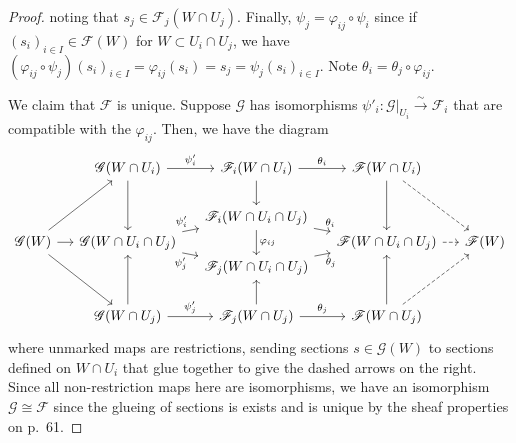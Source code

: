 \documentclass[12pt,letterpaper]{article}
\theoremstyle{definition}
\theoremstyle{remark}
\numberwithin{equation}{section}
\numberwithin{figure}{problem}
\newcommand{\isoto}{\overset{\sim}{\to}}%
\begin{document}
\begin{proof}
  noting that $s_j \in \mathscr{F}_j(W \cap U_j)$. Finally, $\psi_j = \varphi_{ij} \circ \psi_i$ since if $(s_i)_{i \in I} \in \mathscr{F}(W)$ for $W \subset U_i \cap U_j$, we have $(\varphi_{ij} \circ \psi_j)(s_i)_{i \in I} = \varphi_{ij}(s_i) = s_j = \psi_j(s_i)_{i \in I}$. Note $\theta_i = \theta_j \circ \varphi_{ij}$.
  \par We claim that $\mathscr{F}$ is unique. Suppose $\mathscr{G}$ has isomorphisms $\psi'_i\colon \mathscr{G}\vert_{U_i} \isoto \mathscr{F}_i$ that are compatible with the $\varphi_{ij}$. Then, we have the diagram
  \begin{equation*}
    \begin{tikzcd}[row sep=0.1ex,column sep=small]
      {}& \mathscr{G}(W \cap U_i) \rar{\psi'_i} \arrow{ddd} & \mathscr{F}_i(W \cap U_i) \rar{\theta_i}\arrow{dd} & \mathscr{F}(W \cap U_i)\arrow{ddd}\arrow[dashed]{dddr}\\
      \vphantom{\vert}\\
      & & \mathscr{F}_i(W \cap U_i \cap U_j)\arrow{dd}{\varphi_{ij}} \arrow{dr}{\theta_i}\\
      \mathscr{G}(W) \arrow{uuur}\arrow{dddr}\rar & \mathscr{G}(W \cap U_i \cap U_j)\arrow{ur}{\psi'_i}\arrow{dr}[swap]{\psi'_j} & & \mathscr{F}(W \cap U_i \cap U_j) \rar[dashed] & \mathscr{F}(W)\\
      & & \mathscr{F}_j(W \cap U_i \cap U_j)\arrow{ur}[swap]{\theta_j}\\
      \vphantom{\vert}\\
      {}& \mathscr{G}(W \cap U_j) \rar{\psi'_j}\arrow{uuu} & \mathscr{F}_j(W \cap U_j) \rar{\theta_j}\arrow{uu} & \mathscr{F}(W \cap U_j)\arrow{uuu}\arrow[dashed]{uuur}
    \end{tikzcd}
  \end{equation*}
  where unmarked maps are restrictions, sending sections $s \in \mathscr{G}(W)$ to sections defined on $W \cap U_i$ that glue together to give the dashed arrows on the right. Since all non-restriction maps here are isomorphisms, we have an isomorphism $\mathscr{G} \cong \mathscr{F}$ since the glueing of sections is exists and is unique by the sheaf properties on p.~61.
\end{proof}

\printbibliography
\end{document}

